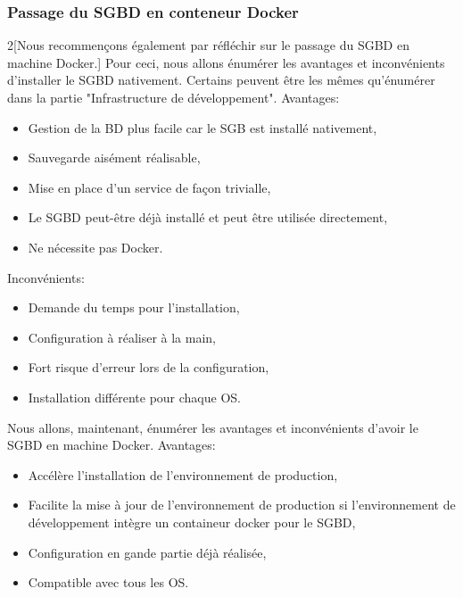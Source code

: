 \documentclass[
    iai, %
    il, %
]{heig-tb}
\begin{document}
\subsubsection{Passage du SGBD en conteneur Docker}
\begin{multicols}{2}[Nous recommençons également par réfléchir sur le passage du SGBD en machine Docker.]
    Pour ceci, nous allons énumérer les avantages et inconvénients d'installer le SGBD nativement.
    Certains peuvent être les mêmes qu'énumérer dans la partie "Infrastructure de développement".\newline %
    Avantages:
    \begin{itemize}
        \item Gestion de la BD plus facile car le SGB est installé nativement,
        \item Sauvegarde aisément réalisable,
        \item Mise en place d'un service de façon trivialle,
        \item Le SGBD peut-être déjà installé et peut être utilisée directement,
        \item Ne nécessite pas Docker.
    \end{itemize}

    Inconvénients:
    \begin{itemize}
        \item Demande du temps pour l'installation,
        \item Configuration à réaliser à la main,
        \item Fort risque d'erreur lors de la configuration,
        \item Installation différente pour chaque OS.
    \end{itemize}

    \columnbreak
    Nous allons, maintenant, énumérer les avantages et inconvénients d'avoir le SGBD en machine Docker.\newline
    Avantages:
    \begin{itemize}
        \item Accélère l'installation de l'environnement de production,
        \item Facilite la mise à jour de l'environnement de production si l'environnement de développement intègre un containeur docker pour le SGBD,
        \item Configuration en gande partie déjà réalisée,
        \item Compatible avec tous les OS.
    \end{itemize}


\end{multicols}
\end{document}
